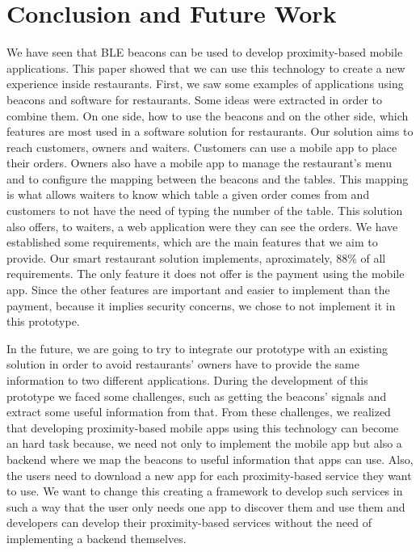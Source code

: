 
\section{Conclusion and Future Work}
\label{sec:conclusion_and_future_work}
We have seen that BLE beacons can be used to develop proximity-based
mobile applications. This paper showed that we can use this technology
to create a new experience inside restaurants.
First, we saw some examples of applications using beacons and software
for restaurants. Some ideas were extracted in order to combine them.
On one side, how to use the beacons and on the other side, which
features are most used in a software solution for restaurants.
Our solution aims to reach customers, owners and waiters.
Customers can use a mobile app to place their orders.
Owners also have a mobile app to manage the restaurant's menu and to
configure the mapping between the beacons and the tables.
This mapping is what allows waiters to know which table a given order
comes from
and customers to not have the need of typing the number of the table.
This solution also offers, to waiters, a web application were they
can see the orders.
We have established some requirements, which are the main
features that we aim to provide.
Our smart restaurant solution implements, aproximately,
88\% of all requirements. The only feature it does not offer is
the payment using the mobile app. Since the other features are
important and easier to implement than the payment, because
it implies security concerns, we chose to not implement it in
this prototype.

In the future, we are going to try to integrate our
prototype with an existing solution in order to avoid
restaurants' owners have to provide the same information
to two different applications. During the development
of this prototype we faced some challenges, such as
getting the beacons' signals and extract some useful
information from that. From these challenges, we
realized that developing proximity-based mobile
apps using this technology can become an hard task
because, we need not only to implement the mobile app
but also a backend where we map the beacons to
useful information that apps can use. Also, the users
need to download a new app for each proximity-based
service they want to use. We want to change this
creating a framework to develop such services
in such a way that the user only needs one app
to discover them and use them and developers
can develop their proximity-based services
without the need of implementing a backend
themselves.
